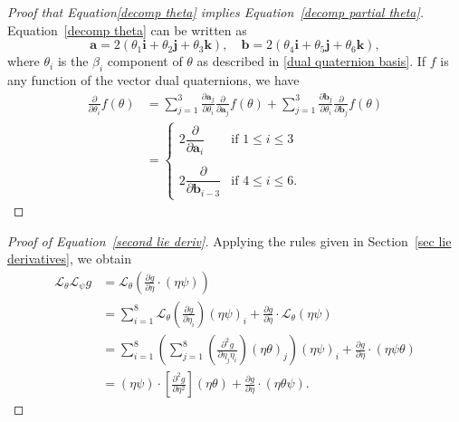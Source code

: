 \documentclass[reqno,12pt]{amsart}
\newcommand{\liederiv}{\mathcal L}
\begin{document}
\begin{proof}[Proof that Equation\eqref{decomp theta} implies Equation~\eqref{decomp partial theta}]
Equation~\eqref{decomp theta} can be written as
\begin{equation}
\bm a = 2(\theta_1 \bm i + \theta_2 \bm j + \theta_3 \bm k), \quad
\bm b = 2(\theta_4 \bm i + \theta_5 \bm j + \theta_6 \bm k),
\end{equation}
where $\theta_i$ is the $\beta_i$ component of $\theta$ as described in \eqref{dual quaternion basis}.  If $f$ is any function of the vector dual quaternions, we have
\begin{equation}
\begin{aligned}
\frac{\partial}{\partial \theta_i} f(\theta)
&= \sum_{j=1}^3 \frac{\partial \bm a_j}{\partial \theta_i} \frac{\partial}{\partial \bm a_j} f(\theta)
+ \sum_{j=1}^3 \frac{\partial \bm b_j}{\partial \theta_i} \frac{\partial}{\partial \bm b_j} f(\theta)
\\&
= \begin{cases}
2 \dfrac{\partial}{\partial \bm a_i} & \text{if $1 \le i \le 3$} \\ \\
2 \dfrac{\partial}{\partial \bm b_{i-3}} & \text{if $4 \le i \le 6$.}
\end{cases}
\end{aligned}
\end{equation}
\end{proof}

\begin{proof}[Proof of Equation~\eqref{second lie deriv}]
Applying the rules given in Section~\ref{sec lie derivatives}, we obtain
\begin{align}
\liederiv_\theta \liederiv_\psi g
&= 
\liederiv_\theta \left( \frac{\partial g}{\partial \eta} \cdot (\eta \psi) \right) \\
&= 
\sum_{i=1}^8 \liederiv_\theta\left(\frac{\partial g}{\partial \eta_i}\right) (\eta \psi)_i +
\frac{\partial g}{\partial \eta} \cdot \liederiv_\theta (\eta \psi) \\
&= 
\sum_{i=1}^8 \left( \sum_{j=1}^8\left(\frac{\partial^2 g}{\partial \eta_j \eta_i}\right)(\eta\theta)_j\right) (\eta \psi)_i +
 \frac{\partial g}{\partial \eta} \cdot (\eta \psi \theta) \\
&= (\eta \psi) \cdot \left[\frac{\partial^2 g}{\partial \eta^2}\right](\eta \theta) + \frac{\partial g}{\partial \eta} \cdot (\eta \theta \psi) .
\end{align}
\end{proof}
\end{document}
